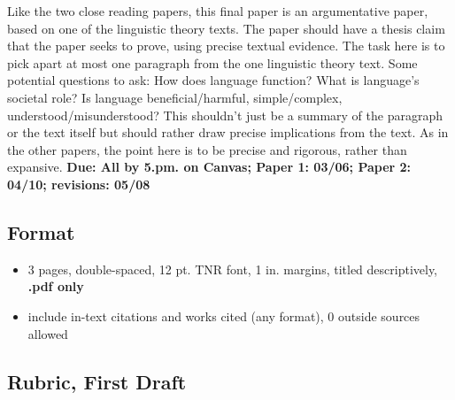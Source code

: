 \documentclass[12pt]{article}
\begin{document}
Like the two close reading papers, this final paper is an argumentative paper, based on one of the linguistic theory texts. The paper should have a thesis claim that the paper seeks to prove, using precise textual evidence. The task here is to pick apart at most one paragraph from the one linguistic theory text. Some potential questions to ask: How does language function? What is language's societal role? Is language beneficial/harmful, simple/complex, understood/misunderstood? This shouldn't just be a summary of the paragraph or the text itself but should rather draw precise implications from the text. As in the other papers, the point here is to be precise and rigorous, rather than expansive. \textbf{Due: All by 5.pm. on Canvas; Paper 1: 03/06; Paper 2: 04/10; revisions: 05/08}

\subsection{Format}

\begin{itemize}
\item 3 pages, double-spaced, 12 pt. TNR font, 1 in. margins, titled descriptively, \textbf{.pdf only}
\item include in-text citations and works cited (any format), 0 outside sources allowed
\end{itemize}

\subsection{Rubric, First Draft}
\end{document}
